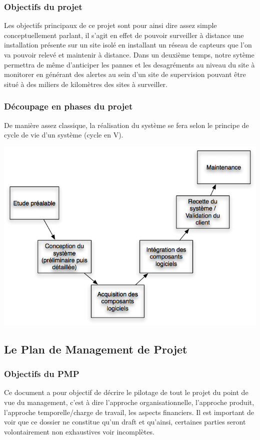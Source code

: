 \subsubsection{Objectifs du projet}
Les objectifs principaux de ce projet sont pour ainsi dire assez simple conceptuellement parlant, il s'agit en effet de pouvoir surveiller à distance une installation présente sur un site isolé en installant un réseau de capteurs que l'on va pouvoir relevé et maintenir à distance. Dans un deuxième temps, notre sytème permettra de même d'anticiper les pannes et les desagréments au niveau du site à monitorer en générant des alertes au sein d'un site de supervision pouvant être situé à des miliers de kilomètres des sites à surveiller.

\subsubsection{Découpage en phases du projet}
De manière assez classique, la réalisation du système se fera selon le principe de cycle de vie d'un système (cycle en V).
\begin {center}
\includegraphics[width=\textwidth]{png/cycleVSysteme.png}
\end {center}

\subsection{Le Plan de Management de Projet}
\subsubsection{Objectifs du PMP}
Ce document a pour objectif de décrire le pilotage de  tout le projet du point de vue du management, c'est à dire l'approche organisationnelle, l'approche produit, l'approche temporelle/charge de travail, les aspects financiers. Il est important de voir que ce dossier ne constitue qu'un draft et qu'ainsi, certaines parties seront volontairement non exhaustives voir incomplètes.

